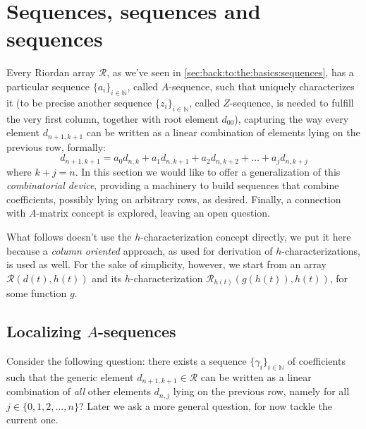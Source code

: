 

\section{Sequences, sequences and sequences}

Every Riordan array $\mathcal{R}$, as we've seen in 
\autoref{sec:back:to:the:basics:sequences}, has a particular sequence 
$\lbrace a_i\rbrace_{i\in\mathbb{N}}$,
called $A$-sequence, such that uniquely characterizes it (to be precise another sequence
$\lbrace z_i\rbrace_{i\in\mathbb{N}}$, called $Z$-sequence, is needed 
to fulfill the very first column, together with root element $d_{00}$), 
capturing the way every element $d_{n+1,k+1}$ can be written as a linear combination
of elements lying on the previous row, formally:
\begin{displaymath}
    d_{n+1,k+1} = a_{0}d_{n,k} +a_{1}d_{n,k+1} +a_{2}d_{n,k+2} + 
        \ldots + a_{j}d_{n,k+j}
\end{displaymath}
where $k+j = n$. In this section we would like to offer a generalization
of this \emph{combinatorial device}, providing a machinery to build sequences 
that combine coefficients, possibly lying on arbitrary rows, as desired.
Finally, a connection with $A$-matrix concept is explored, leaving an open 
question.

What follows doesn't use the $h$-characterization concept directly, 
we put it here because a \emph{column oriented}
approach, as used for derivation of $h$-characterizations, is used as well. 
For the sake of simplicity,
however, we start from an array $\mathcal{R}(d(t),h(t))$ and its 
$h$-characterization $\mathcal{R}_{h(t)}(g(h(t)), h(t))$, for some function $g$.

\subsection{Localizing $A$-sequences}

Consider the following question: there exists a sequence 
$\lbrace \gamma_{i} \rbrace_{i\in\mathbb{N}}$ of coefficients 
such that the generic element $d_{n+1,k+1}\in\mathcal{R}$ can be written
as a linear combination of \emph{all} other elements $d_{n,j}$ 
lying on the previous row, namely for all $j\in\lbrace0,1,2,\ldots,n\rbrace$? 
Later we ask a more general question, for now tackle the current one.

